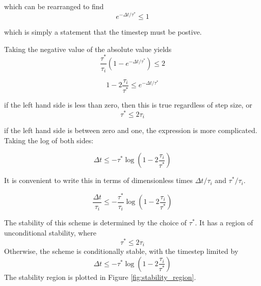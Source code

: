 \documentclass[preprint,12pt,authoryear]{elsarticle}
\begin{document}
which can be rearranged to find
\begin{equation}
e^{-\Delta t/\tau^*} \le 1
\end{equation}

which is simply a statement that the timestep must be postive.

Taking the negative value of the absolute value yields
\begin{equation}
  \frac{\tau^*}{\tau_i} \left(1-e^{-\Delta t/\tau^*} \right)  \le 2
\end{equation}

\begin{equation}
 1 - 2 \frac{\tau_i}{\tau^*} \le e^{-\Delta t/\tau^*}
\end{equation}

if the left hand side is less than zero, then this is true regardless of step size, or
\begin{equation}
\tau^* \le 2 \tau_i
\end{equation}

if the left hand side is between zero and one, the expression is more complicated. 
Taking the log of both sides:

\begin{equation}
\Delta t \le -\tau^* \log \left(1 - 2 \frac{\tau_i}{\tau^*} \right)
\end{equation}

It is convenient to write this in terms of dimensionless times $\Delta t/ \tau_i$ and $\tau^*/\tau_i$.

\begin{equation}
\frac{\Delta t}{\tau_i} \le -\frac{\tau^*}{\tau_i} \log \left(1 - 2 \frac{\tau_i}{\tau^*} \right)
\end{equation}

\fi

The stability of this scheme is determined by the choice of $\tau^*$.  
It has a region of unconditional stability, where
\begin{equation}
\tau^* \le 2 \tau_i
\end{equation}
Otherwise, the scheme is conditionally stable, with the timestep limited by 
\begin{equation}
\Delta t \le -\tau^* \log \left(1 - 2 \frac{\tau_i}{\tau^*} \right)
\end{equation}
The stability region is plotted in Figure \ref{fig:stability_region}. 
\end{document}
